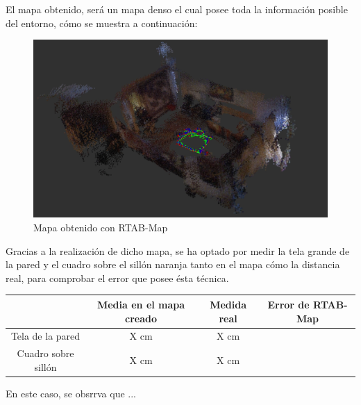 El mapa obtenido, será un mapa denso el cual posee toda la información posible del entorno, cómo se muestra a continuación:
\begin{figure}[h!]
    \centering
    \includegraphics[width=.9\textwidth]{images/slam/bag1_rtabmapbonito}
    \caption{Mapa obtenido con RTAB-Map}
\end{figure}

Gracias a la realización de dicho mapa, se ha optado por medir la tela grande de la pared y el cuadro sobre el sillón naranja tanto en el mapa cómo la distancia real, para comprobar
el error que posee ésta técnica.

\begin{center}
\begin{tabular}{ c | c | c | c }
     & Media en el mapa creado & Medida real & Error de RTAB-Map\\
     \hline
     Tela de la pared & X cm & X cm \\
     Cuadro sobre sillón & X cm & X cm \\
\end{tabular}
\end{center}

En este caso, se obsrrva que ...

